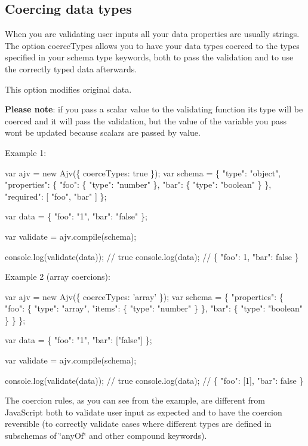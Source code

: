 \subsection*{Coercing data types}

When you are validating user inputs all your data properties are usually strings. The option {\ttfamily coerce\+Types} allows you to have your data types coerced to the types specified in your schema {\ttfamily type} keywords, both to pass the validation and to use the correctly typed data afterwards.

This option modifies original data.

{\bfseries Please note}\+: if you pass a scalar value to the validating function its type will be coerced and it will pass the validation, but the value of the variable you pass won\textquotesingle{}t be updated because scalars are passed by value.

Example 1\+:


\begin{DoxyCode}
var ajv = new Ajv(\{ coerceTypes: true \});
var schema = \{
  "type": "object",
  "properties": \{
    "foo": \{ "type": "number" \},
    "bar": \{ "type": "boolean" \}
  \},
  "required": [ "foo", "bar" ]
\};

var data = \{ "foo": "1", "bar": "false" \};

var validate = ajv.compile(schema);

console.log(validate(data)); // true
console.log(data); // \{ "foo": 1, "bar": false \}
\end{DoxyCode}


Example 2 (array coercions)\+:


\begin{DoxyCode}
var ajv = new Ajv(\{ coerceTypes: 'array' \});
var schema = \{
  "properties": \{
    "foo": \{ "type": "array", "items": \{ "type": "number" \} \},
    "bar": \{ "type": "boolean" \}
  \}
\};

var data = \{ "foo": "1", "bar": ["false"] \};

var validate = ajv.compile(schema);

console.log(validate(data)); // true
console.log(data); // \{ "foo": [1], "bar": false \}
\end{DoxyCode}


The coercion rules, as you can see from the example, are different from Java\+Script both to validate user input as expected and to have the coercion reversible (to correctly validate cases where different types are defined in subschemas of \char`\"{}any\+Of\char`\"{} and other compound keywords).

